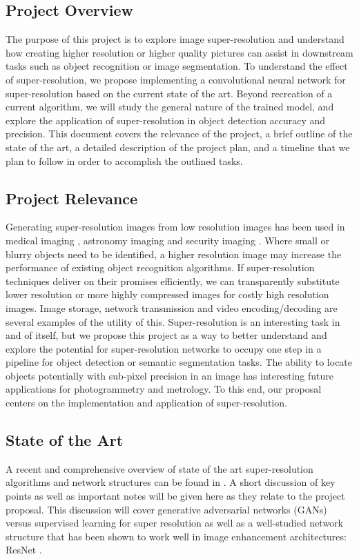 \documentclass{article}
\begin{document}
\subsection{Project Overview}
The purpose of this project is to explore image super-resolution and understand how creating higher resolution or higher quality pictures can assist in downstream tasks such as object recognition or image segmentation. To understand the effect of super-resolution, we propose implementing a convolutional neural network for super-resolution based on the current state of the art. Beyond recreation of a current algorithm, we will study the general nature of the trained model, and explore the application of super-resolution in object detection accuracy and precision. This document covers the relevance of the project, a brief outline of the state of the art, a detailed description of the project plan, and a timeline that we plan to follow in order to accomplish the outlined tasks. 


\subsection{Project Relevance}
Generating super-resolution images from low resolution images has been used in medical imaging \cite{Pham2019, Georgescu2020}, astronomy imaging \cite{zhang2019} and security imaging \cite{yang2019deep}. Where small or blurry objects need to be identified, a higher resolution image may increase the performance of existing object recognition algorithms. If super-resolution techniques deliver on their promises efficiently, we can transparently substitute lower resolution or more highly compressed images for costly high resolution images. Image storage, network transmission and video encoding/decoding  are several examples of the utility of this. Super-resolution is an interesting task in and of itself, but we propose this project as a way to better understand and explore the potential for super-resolution networks to occupy one step in a pipeline for object detection or semantic segmentation tasks. The ability to locate objects potentially with sub-pixel precision in an image has interesting future applications for photogrammetry and metrology. To this end, our proposal centers on the implementation and application of super-resolution.


\subsection{State of the Art}
A recent and comprehensive overview of state of the art super-resolution algorithms and network structures can be found in \cite{yang2019deep}. A short discussion of key points as well as important notes will be given here as they relate to the project proposal. This discussion will cover generative adversarial networks (GANs) versus supervised learning for super resolution as well as a well-studied network structure that has been shown to work well in image enhancement architectures: ResNet \cite{he2016deep}.
\end{document}
